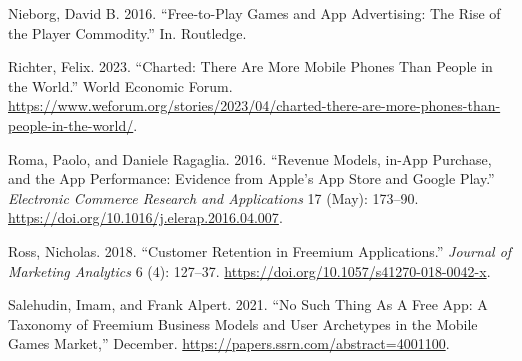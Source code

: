 \documentclass[
  12pt,
  a4paper,
]{article}
\newlength{\cslhangindent}
\newenvironment{CSLReferences}[2] %
 {\begin{list}{}{%
  \setlength{\itemindent}{0pt}
  \setlength{\leftmargin}{0pt}
  \setlength{\parsep}{0pt}
  \ifodd #1
   \setlength{\leftmargin}{\cslhangindent}
   \setlength{\itemindent}{-1\cslhangindent}
  \fi
  \setlength{\itemsep}{#2\baselineskip}}}
 {\end{list}}
\begin{document}
\begin{CSLReferences}{1}{0}
Nieborg, David B. 2016. {``Free-to-Play Games and App Advertising: The
Rise of the Player Commodity.''} In. Routledge.

Richter, Felix. 2023. {``Charted: There Are More Mobile Phones Than
People in the World.''} World Economic Forum.
\url{https://www.weforum.org/stories/2023/04/charted-there-are-more-phones-than-people-in-the-world/}.

Roma, Paolo, and Daniele Ragaglia. 2016. {``Revenue Models, in-App
Purchase, and the App Performance: Evidence from Apple{'}s App Store and
Google Play.''} \emph{Electronic Commerce Research and Applications} 17
(May): 173--90. \url{https://doi.org/10.1016/j.elerap.2016.04.007}.

Ross, Nicholas. 2018. {``Customer Retention in Freemium Applications.''}
\emph{Journal of Marketing Analytics} 6 (4): 127--37.
\url{https://doi.org/10.1057/s41270-018-0042-x}.

Salehudin, Imam, and Frank Alpert. 2021. {``No Such Thing As A Free App:
A Taxonomy of Freemium Business Models and User Archetypes in the Mobile
Games Market,''} December.
\url{https://papers.ssrn.com/abstract=4001100}.

\end{CSLReferences}
\end{document}
